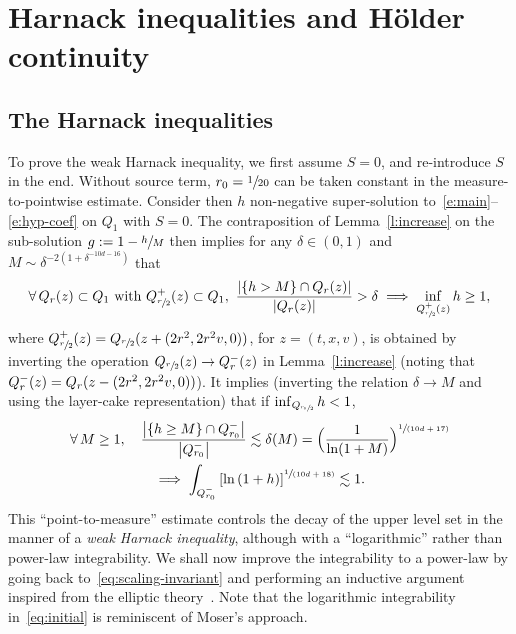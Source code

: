 \documentclass[JEP,XML,SOM,Unicode,NoFloatCountersInSection,published]{cedram}
\newcommand{\spfrac}[2]{\sfrac{#1}{(#2)}}
\theoremstyle{definition}
\theoremstyle{remark}
\begin{document}
\section{Harnack inequalities and Hölder continuity}
\label{sec:Harnack}

\subsection{The Harnack inequalities}

To prove the weak Harnack inequality, we first assume $S=0$, and
re-introduce $S$ in the end. Without source term,
$r_0=\sfrac{1}{20}$ can be taken constant in the
measure-to-pointwise estimate. Consider then $h$ non-negative
super-solution to~\eqref{e:main}--\eqref{e:hyp-coef} on $Q_1$ with
$S=0$. The contraposition of Lemma~\ref{l:increase} on the
sub-solution $g := 1 - \sfrac{h}{M}$ then implies for any
$\delta \in (0,1)$ and $M \sim \delta^{-2 (1+\delta^{-10d-16})}$
that
\begin{equation}
\label{eq:scaling-invariant}
\forall \, Q_r(z) \subset Q_1 \text{ with }
Q_{\sfrac{r}{2}}^{+}(z) \subset Q_1, \
\frac{\left| \{ h > M \} \cap Q_{r}(z) \right|}{\left|
Q_{r}(z) \right|} > \delta \implies \inf_{Q_{\sfrac{r}{2}}^+(z)} h \ge 1,
\end{equation}
where
$Q_{\sfrac{r}{2}}^{+}(z) = Q_{\sfrac{r}{2}}(z +(2r^2,2r^2v,0))$,
for $z=(t,x,v)$, is obtained by inverting the operation
$Q_{\sfrac{r}{2}}(z) \to Q_{r}^-(z)$ in Lemma~\ref{l:increase}
(noting that $Q_r^-(z)=Q_r(z-\nobreak(2r^2,2r^2v,0))$). It implies
(inverting the relation $\delta \to M$ and using the layer-cake
representation) that if $\inf_{Q_{\sfrac{r_0}{2}}} h <1$,
\begin{multline}
\label{eq:initial}
\forall \, M \ge 1, \quad \frac{\left| \{ h \ge M \} \cap
Q_{r_0}^- \right|}{\left|Q_{r_0}^- \right|} \lesssim
\delta(M) =\Bigl( \frac{1}{ \ln (1+M)}
\Bigr)^{\spfrac{1}{10d+17}} \\
\implies
\int_{Q_{r_0}^- } \left[ \ln \left( 1+ h \right)
\right]^{\spfrac{1}{10d+18}} \lesssim 1.
\end{multline}
This ``point-to-measure'' estimate controls the decay of the
upper level set in the manner of a \emph{weak Harnack
inequality}, although with a ``logarithmic'' rather than
power-law integrability. We shall now improve the integrability
to a power-law by going back to~\eqref{eq:scaling-invariant} and
performing an inductive argument inspired from the elliptic
theory~\cite{MR3565366}. Note that the logarithmic integrability
in~\eqref{eq:initial} is reminiscent of Moser's approach.
\end{document}
